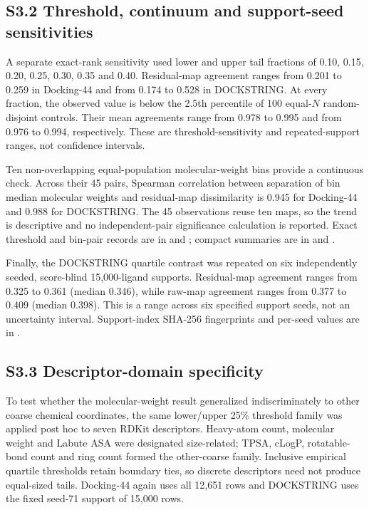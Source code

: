 \documentclass[11pt]{article}
\begin{document}
\subsection*{S3.2 Threshold, continuum and support-seed sensitivities}

A separate exact-rank sensitivity used lower and upper tail fractions of 0.10,
0.15, 0.20, 0.25, 0.30, 0.35 and 0.40. Residual-map agreement ranges from
0.201 to 0.259 in Docking-44 and from 0.174 to 0.528 in DOCKSTRING. At every
fraction, the observed value is below the 2.5th percentile of 100 equal-$N$
random-disjoint controls. Their mean agreements range from 0.978 to 0.995 and
from 0.976 to 0.994, respectively. These are threshold-sensitivity and
repeated-support ranges, not confidence intervals.

Ten non-overlapping equal-population molecular-weight bins provide a continuous
check. Across their 45 pairs, Spearman correlation between separation of bin
median molecular weights and residual-map dissimilarity is 0.945 for
Docking-44 and 0.988 for DOCKSTRING. The 45 observations reuse ten maps, so the
trend is descriptive and no independent-pair significance calculation is
reported. Exact threshold and bin-pair records are in
 and
;
compact summaries are in
and
.

Finally, the DOCKSTRING quartile contrast was repeated on six independently
seeded, score-blind 15,000-ligand supports. Residual-map agreement ranges from
0.325 to 0.361 (median 0.346), while raw-map agreement ranges from 0.377 to
0.409 (median 0.398). This is a range across six specified support seeds, not
an uncertainty interval. Support-index SHA-256 fingerprints and per-seed
values are in
.

\subsection*{S3.3 Descriptor-domain specificity}

To test whether the molecular-weight result generalized indiscriminately to
other coarse chemical coordinates, the same lower/upper 25\% threshold family
was applied post hoc to seven RDKit descriptors. Heavy-atom count, molecular
weight and Labute ASA were designated size-related; TPSA, cLogP, rotatable-bond
count and ring count formed the other-coarse family. Inclusive empirical
quartile thresholds retain boundary ties, so discrete descriptors need not
produce equal-sized tails. Docking-44 again uses all 12,651 rows and
DOCKSTRING uses the fixed seed-71 support of 15,000 rows.
\end{document}
